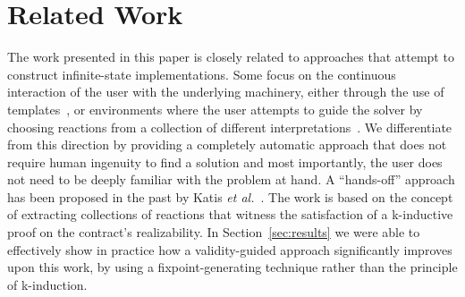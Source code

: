 \section{Related Work}
\label{sec:related}

\iffalse
The alternative name to program synthesis is Church's problem, since the description of the problem was first described by Church in 1963~\cite{church1962logic}. Research in this field of program synthesis attributes began in the 1970s, when Manna and Waldinger~\cite{manna1971toward} first introduced a synthesis procedure using principles of theorem proving. Almost two decades later, Pnueliand Rosner~\cite{pnueli1989synthesis} first formally described the
implementability of reactive systems, considering first order logic formulas
that stem from temporal specifications. In the same work, they provided a
complete approach to synthesize finite-state implementations through the
construction of deterministic Rabin automata.

In the recent years, program synthesis has enjoyed a vast variety of
contributions under numerous contexts. Gulwani~\cite{gulwani2010dimensions}
presented an extended survey, hinting future research directions. Synthesis
algorithms have been proposed for simple LTL specification~\cite{Bohy12,Tini03}
subsets of it~\cite{Klein10,ehlers2010symbolic,cheng2016structural}, as well as under other temporal logics~\cite{monmege2016real,Hamza10}, such as SIS~\cite{Aziz95}.
Chatterjee and Henzinger~\cite{Chatterjee07} proposed a novel component-based approach using the notion of Assume-Guarantee contracts. 
\fi
The work presented in this paper is closely related to approaches that attempt
to construct infinite-state implementations. Some focus on the continuous
interaction of the user with the underlying machinery, either through the use of
templates~\cite{srivastava2013template,beyene2014constraint}, or environments where the user attempts to guide the solver by choosing reactions from a collection of different
interpretations~\cite{ryzhyk2016developing}. We differentiate from this
direction by providing a completely automatic approach that does not require
human ingenuity to find a solution and most importantly, the user
does not need to be deeply familiar with the problem at hand. A ``hands-off''
approach has been proposed in the past by Katis \textit{et
al.}~\cite{gacek2015towards,katis2016towards,katis2016synthesis}. The work is
based on the concept of extracting collections of reactions that witness the satisfaction of a k-inductive proof on the contract's realizability. In
Section~\ref{sec:results} we were able to effectively show in practice how a
validity-guided approach significantly improves upon this work, by using a
fixpoint-generating technique rather than the principle of k-induction.

